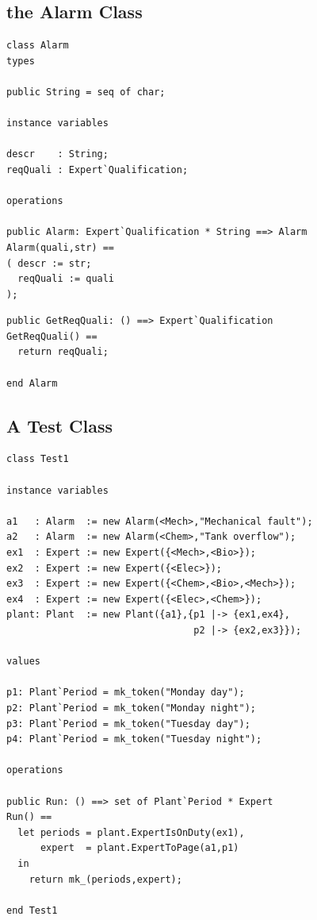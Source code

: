 \subsection{the Alarm Class}

\begin{lstlisting}
class Alarm
types

public String = seq of char;

instance variables 

descr    : String;
reqQuali : Expert`Qualification;

operations

public Alarm: Expert`Qualification * String ==> Alarm
Alarm(quali,str) ==
( descr := str;
  reqQuali := quali
);
\end{lstlisting}

\begin{lstlisting}
public GetReqQuali: () ==> Expert`Qualification
GetReqQuali() ==
  return reqQuali;
  
end Alarm
\end{lstlisting}

\subsection{A Test Class}

\begin{lstlisting}
class Test1

instance variables

a1   : Alarm  := new Alarm(<Mech>,"Mechanical fault");
a2   : Alarm  := new Alarm(<Chem>,"Tank overflow");
ex1  : Expert := new Expert({<Mech>,<Bio>});
ex2  : Expert := new Expert({<Elec>});
ex3  : Expert := new Expert({<Chem>,<Bio>,<Mech>});
ex4  : Expert := new Expert({<Elec>,<Chem>});
plant: Plant  := new Plant({a1},{p1 |-> {ex1,ex4},
                                 p2 |-> {ex2,ex3}});

values

p1: Plant`Period = mk_token("Monday day");
p2: Plant`Period = mk_token("Monday night");
p3: Plant`Period = mk_token("Tuesday day");
p4: Plant`Period = mk_token("Tuesday night");

operations

public Run: () ==> set of Plant`Period * Expert
Run() == 
  let periods = plant.ExpertIsOnDuty(ex1),
      expert  = plant.ExpertToPage(a1,p1)
  in 
    return mk_(periods,expert);

end Test1
\end{lstlisting}



